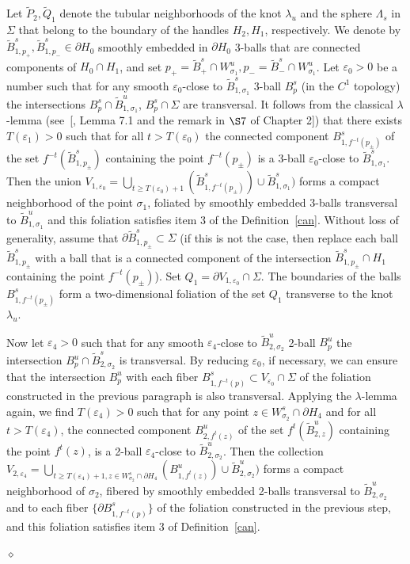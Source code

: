 \documentclass[%
 aip,
 amsmath,amssymb,
preprint,%
]{revtex4-1}
\newenvironment{proof}{{\bf Proof:}}
{\hfill $\diamond$\medskip}
\begin{document}
\begin{proof}
Let $\widetilde P_2, \widetilde Q_1$ denote the tubular neighborhoods of the knot $\lambda_u$ and the sphere $\Lambda_s$ in $\Sigma$ that belong to the boundary  of the handles $H_2,H_1$, respectively.
We denote by 
 $\widetilde B^s_{1,p_+},\widetilde B^s_{1,p_-}\in \partial H_0$  smoothly embedded in $\partial H_0$  3-balls that are  connected components of  $H_0\cap H_1$, and set $p_+=\widetilde B^s_+\cap W^u_{\sigma_1}, p_-=\widetilde B^s_-\cap W^u_{\sigma_1}$. Let  $\varepsilon_{0}>0$ be a number such that for any smooth $\varepsilon_0$-close to $\widetilde B^s_{1,\sigma_1}$ 3-ball $B^s_p$ (in the $C^1$ topology) the intersections $B^s_p\cap \widetilde B^u_{1,\sigma_1}$, $B^s_p\cap \Sigma$ are transversal. It follows from the classical $\lambda$-lemma (see~[, Lemma 7.1 and the remark in $\S 7$ of Chapter 2]) that there exists $T(\varepsilon_1)>0$ such that for all $t>T(\varepsilon_0)$ the connected component $B^s_{1,f^{-t}(p_{\pm})}$ of the set $f^{-t}(\widetilde B^s_{1,p_\pm})$ containing the point $f^{-t}(p_\pm)$ is a 3-ball $\varepsilon_0$-close to $\widetilde B^s_{1,\sigma_1}$. Then the union $V_{1,\varepsilon_0}=\bigcup\limits_{t\geq T(\varepsilon_0)+1} (\widetilde B^s_{1,f^{-t}(p_\pm)})\cup \widetilde B^s_{1,\sigma_1})$ forms a compact neighborhood of the point $\sigma_1$, foliated by smoothly embedded 3-balls transversal to $\widetilde B^u_{1,\sigma_1}$ and this foliation satisfies item 3 of the Definition~\ref{can}. Without loss of generality, assume that $\partial \widetilde B^s_{1,p_\pm}\subset \Sigma$ (if this is not the case, then replace each ball $\widetilde B^s_{1,p_\pm}$ with a ball that is a connected component of the intersection $\widetilde B^s_{1,p_\pm}\cap H_1$ containing the point $f^{-t}(p_\pm)$).
Set $Q_1=\partial V_{1,\varepsilon_0}\cap \Sigma$. The boundaries of the balls $B^s_{1,f^{-t}(p_{\pm})}$ form a two-dimensional foliation of the set $Q_1$ transverse to the knot $\lambda_u$.

Now let $\varepsilon_{4}>0$ such that for any smooth $\varepsilon_4$-close to $\widetilde B^u_{2,\sigma_2}$ 2-ball $B^u_p$ the intersection $B^u_p\cap \widetilde B^s_{2,\sigma_2}$ is transversal.
By reducing $\varepsilon_0$, if necessary, we can ensure that the intersection $B^u_p$ with each fiber $B^s_{1,f^{-t}(p)}\subset V_{\varepsilon_0}\cap \Sigma$ of the foliation constructed in the previous paragraph is also transversal.
Applying the $\lambda$-lemma again, we find $T(\varepsilon_4)>0$ such that for any point $z\in W^s_{\sigma_2}\cap \partial H_4$ and for all $t>T(\varepsilon_4)$, the connected component $B^u_{2,f^t(z)}$ of the set $f^{t}(\widetilde B^u_{2,z})$ containing the point $f^{t}(z)$, is a 2-ball $\varepsilon_4$-close to $\widetilde B^u_{2,\sigma_2}$.
Then the collection $V_{2,\varepsilon_4}=\bigcup\limits_{t\geq T(\varepsilon_4)+1,z\in W^s_{\sigma_2}\cap \partial H_4} (B^u_{1,f^t(z)})\cup \widetilde B^u_{2,\sigma_2})$ forms a compact neighborhood of $\sigma_2$, fibered by smoothly embedded 2-balls transversal to $\widetilde B^u_{2,\sigma_2}$ and to each fiber $\{\partial B^s_{1,f^{-t}(p)}\}$ of the foliation constructed in the previous step, and this foliation satisfies item 3 of Definition~\ref{can}.


\end{proof}
\end{document}
